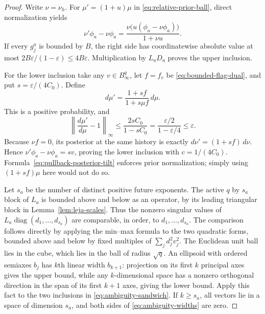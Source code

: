 \begin{proof}
Write $\nu=\nu_h$. For $\mu'=(1+u)\mu$ in
\eqref{eq:relative-prior-ball}, direct normalization yields
\[
 \nu'\phi_a-\nu\phi_a
 =\frac{\nu\bigl(u(\phi_a-\nu\phi_a)\bigr)}{1+\nu u}.
\]
If every $g_j^a$ is bounded by $B$, the right side has coordinatewise
absolute value at most $2B\varepsilon/(1-\varepsilon)\le4B\varepsilon$.
Multiplication by $L_aD_a$ proves the upper inclusion.

For the lower inclusion take any $v\in B_\infty^q$, let $f=f_v$ be
\eqref{eq:bounded-flag-dual}, and put $s=\varepsilon/(4C_0)$. Define
\begin{equation}\label{eq:pullback-posterior-tilt}
 d\mu' =\frac{1+s f}{1+s\mu f}\,d\mu.
\end{equation}
This is a positive probability, and
\[
 \left\|\frac{d\mu'}{d\mu}-1\right\|_\infty
 \le\frac{2s C_0}{1-s C_0}
 =\frac{\varepsilon/2}{1-\varepsilon/4}\le\varepsilon.
\]
Because $\nu f=0$, its posterior at the same history is exactly
$d\nu'=(1+s f)\,d\nu$. Hence
$\nu'\phi_a-\nu\phi_a=s v$, proving the lower inclusion with
$c=1/(4C_0)$. Formula~\eqref{eq:pullback-posterior-tilt} enforces prior
normalization; simply using $(1+s f)\mu$ here would not do so.

Let $s_a$ be the number of distinct positive future exponents. The active
$q$ by $s_a$ block of $L_a$ is bounded above and below as an operator,
by its leading triangular block in Lemma~\ref{lem:leja-scales}.
Thus the nonzero singular values of
$L_a\operatorname{diag}(d_1,\ldots,d_{s_a})$ are comparable, in order,
to $d_1,\ldots,d_{s_a}$. The comparison follows directly by applying
the min--max formula to the two quadratic forms, bounded above and below
by fixed multiples of $\sum_jd_j^2v_j^2$.
The Euclidean unit ball lies in the cube, which lies in the ball of
radius $\sqrt q$. An ellipsoid with ordered semiaxes $b_j$ has $k$th
linear width $b_{k+1}$: projection on its first $k$ principal axes gives
the upper bound, while any $k$-dimensional space has a nonzero
orthogonal direction in the span of its first $k+1$ axes, giving the
lower bound. Apply this fact to the two inclusions in
\eqref{eq:ambiguity-sandwich}. If $k\ge s_a$, all vectors lie in a
space of dimension $s_a$, and both sides of
\eqref{eq:ambiguity-widths} are zero.
\end{proof}

